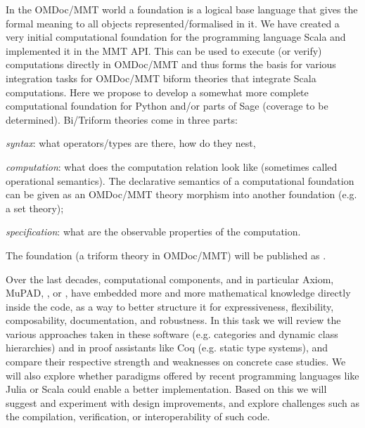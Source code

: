 \begin{workpackage}[id=dksbases,%
  title=Data/Knowledge/Software-Bases,lead=FAU,
  ZHRM=12,JURM=12,FAURM=34,UWRM=25,SARM=10,LLRM=2,PSRM=25]
\begin{tasklist}
\begin{task}[title=Computational Foundation for Python/Sage,
  id=data-foundationCAS,lead=FAU,partners={ZH,SA,JU},PM=9,wphases=6-18!.66,issue=126]
  In the OMDoc/MMT world a foundation is a logical base language that gives the formal
  meaning to all objects represented/formalised in it. We have created a very initial
  computational foundation for the programming language Scala and implemented it in the MMT API. This can be used
  to execute (or verify) computations directly in OMDoc/MMT and thus forms the basis for
  various integration tasks for OMDoc/MMT biform theories that integrate Scala
  computations. Here we propose to develop a somewhat more complete computational
  foundation for Python and/or parts of Sage (coverage to be determined). Bi/Triform
  theories come in three parts:
  \begin{compactitem}
  \item \emph{syntax}: what operators/types are there, how do they nest,
  \item \emph{computation}: what does the computation relation look like (sometimes called
    operational semantics). The declarative semantics of a computational foundation can be
    given as an OMDoc/MMT theory morphism into another foundation (e.g. a set theory);
  \item \emph{specification}: what are the observable properties of the computation. 
  \end{compactitem}
  The foundation (a triform theory in OMDoc/MMT) will be published as
  .
\end{task}

\begin{task}[title=Knowledge-based code infrastructure, id=research-categories,lead=PS,partners={ZH,JU,FAU},PM=21,wphases=12-48,issue=127]
  Over the last decades, computational components, and in particular
  Axiom, MuPAD, \GAP, or \Sage, have embedded more and more
  mathematical knowledge directly inside the code, as a way to better
  structure it for expressiveness, flexibility, composability,
  documentation, and robustness. In this task we will review the
  various approaches taken in these software (e.g. categories and
  dynamic class hierarchies) and in proof assistants like Coq
  (e.g. static type systems), and compare their respective strength
  and weaknesses on concrete case studies. We will also explore
  whether paradigms offered by recent programming languages like Julia
  or Scala could enable a better implementation. Based on this we will
  suggest and experiment with design improvements, and explore
  challenges such as the compilation, verification, or
  interoperability of such code.
\end{task}


\end{tasklist}
\end{workpackage}

